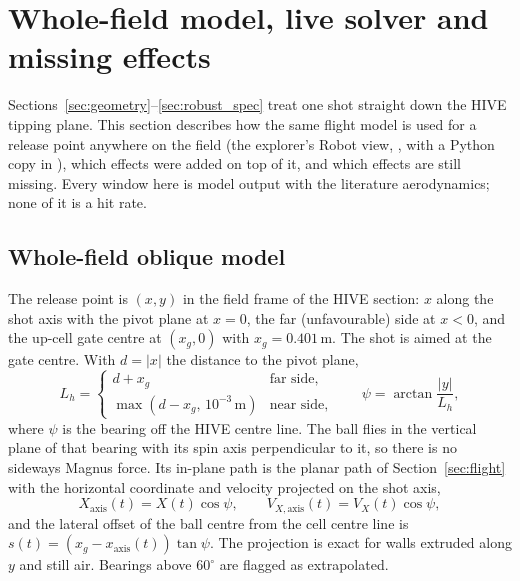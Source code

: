 \section{Whole-field model, live solver and missing effects}
\label{sec:field}

Sections~\ref{sec:geometry}--\ref{sec:robust_spec} treat one shot straight down the HIVE tipping
plane. This section describes how the same flight model is used for a release point anywhere on the
field (the explorer's Robot view, , with a Python copy in
), which effects were added on top of it, and which effects are still missing. Every
window here is model output\predicted{} with the literature aerodynamics\assumed; none of it is a
hit rate.

\subsection{Whole-field oblique model}
\label{sec:field-oblique}

The release point is $(x,y)$ in the field frame of the HIVE section: $x$ along the shot axis with the
pivot plane at $x=0$, the far (unfavourable) side at $x<0$, and the up-cell gate centre at
$(x_g,0)$ with $x_g=0.401$\,\unit{m}\derived. The shot is aimed at the gate centre. With
$d=|x|$ the distance to the pivot plane,
\begin{equation}
  L_h=\begin{cases} d+x_g & \text{far side},\\ \max(d-x_g,\,10^{-3}\,\text{m}) & \text{near side},\end{cases}
  \qquad \psi=\arctan\frac{|y|}{L_h},
  \label{eq:field-psi}
\end{equation}
where $\psi$ is the bearing off the HIVE centre line\derived. The ball flies in the vertical plane of
that bearing with its spin axis perpendicular to it, so there is no sideways Magnus force. Its
in-plane path is the planar path of Section~\ref{sec:flight} with the horizontal coordinate and
velocity projected on the shot axis,
\begin{equation}
  X_{\text{axis}}(t)=X(t)\cos\psi,\qquad V_{X,\text{axis}}(t)=V_X(t)\cos\psi,
  \label{eq:field-proj}
\end{equation}
and the lateral offset of the ball centre from the cell centre line is
$s(t)=(x_g-x_{\text{axis}}(t))\tan\psi$. The projection is exact for walls extruded along $y$ and
still air. Bearings above $60^\circ$\assumed{} are flagged as extrapolated.

